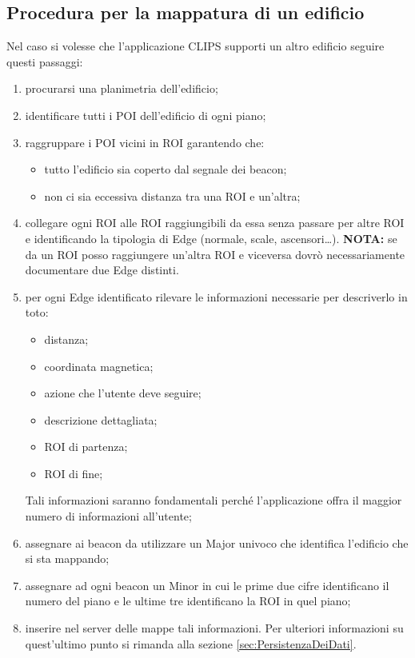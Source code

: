 \documentclass[../ManualeSviluppatore.tex]{subfiles}
\begin{document}
	\subsection{Procedura per la mappatura di un edificio}
		Nel caso si volesse che l'applicazione CLIPS supporti un altro edificio seguire questi passaggi:
		\begin{enumerate}
			\item procurarsi una planimetria dell'edificio;
			\item identificare tutti i POI dell'edificio di ogni piano;
			\item raggruppare i POI vicini in ROI garantendo che:
			\begin{itemize}
				\item tutto l'edificio sia coperto dal segnale dei beacon;
				\item non ci sia eccessiva distanza tra una ROI e un'altra;
			\end{itemize}
			\item collegare ogni ROI alle ROI raggiungibili da essa senza passare per altre ROI e identificando la tipologia di Edge (normale, scale, ascensori\dots). \textbf{NOTA:} se da un ROI posso raggiungere un'altra ROI e viceversa dovrò necessariamente documentare due Edge distinti.
			\item per ogni Edge identificato rilevare le informazioni necessarie per descriverlo in toto:
			\begin{itemize}
				\item distanza;
				\item coordinata magnetica;
				\item azione che l'utente deve seguire;
				\item descrizione dettagliata;
				\item ROI di partenza;
				\item ROI di fine;
			\end{itemize}
			Tali informazioni saranno fondamentali perché l'applicazione offra il maggior numero di informazioni all'utente;
			\item assegnare ai \gls{beacon} da utilizzare un Major univoco che identifica l'edificio che si sta mappando;
			\item assegnare ad ogni \gls{beacon} un Minor in cui le prime due cifre identificano il numero del piano e le ultime tre identificano la ROI in quel piano;
			\item inserire nel server delle mappe tali informazioni. Per ulteriori informazioni su quest'ultimo punto si rimanda alla sezione \ref{sec:PersistenzaDeiDati}.
		\end{enumerate}
		
\end{document}

